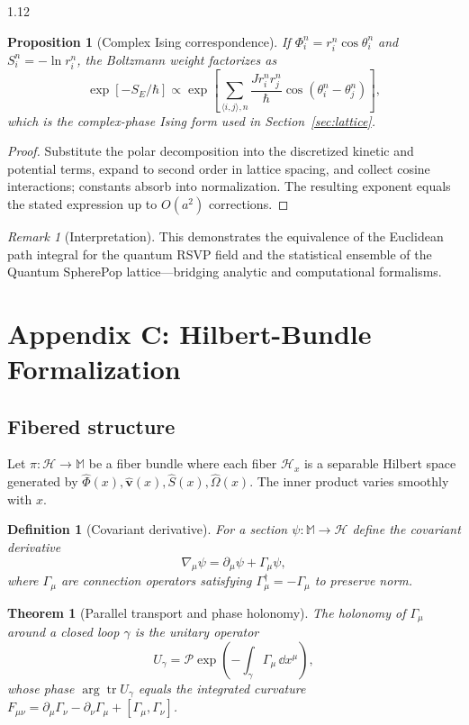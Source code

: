\documentclass[12pt,a4paper]{article}
\numberwithin{equation}{section}
\newtheorem{definition}{Definition}[section]
\newtheorem{proposition}{Proposition}[section]
\newtheorem{theorem}{Theorem}[section]
\theoremstyle{remark}
\newtheorem{remark}{Remark}[section]
\theoremstyle{definition}
\newcommand{\M}{\mathbb{M}}
\begin{document}
\begin{spacing}{1.12}
\begin{proposition}[Complex Ising correspondence]
\label{prop:complex-ising}
If $\Phi_i^n=r_i^n\cos\theta_i^n$ and $S_i^n=-\ln r_i^n$, the Boltzmann weight factorizes as
\[
\exp[-S_E/\hbar]
\propto
\exp\!\left[
\sum_{\langle i,j\rangle,n}
\frac{J r_i^n r_j^n}{\hbar}
\cos(\theta_i^n-\theta_j^n)
\right],
\]
which is the complex-phase Ising form used in Section~\ref{sec:lattice}.
\end{proposition}

\begin{proof}
Substitute the polar decomposition into the discretized kinetic and potential terms, expand to second order in lattice spacing, and collect cosine interactions; constants absorb into normalization.  
The resulting exponent equals the stated expression up to $O(a^2)$ corrections.
\end{proof}

\begin{remark}[Interpretation]
This demonstrates the equivalence of the Euclidean path integral for the quantum RSVP field and the statistical ensemble of the Quantum SpherePop lattice—bridging analytic and computational formalisms.
\end{remark}

\section*{Appendix C: Hilbert-Bundle Formalization}
\label{appendix:C}

\subsection*{Fibered structure}
Let $\pi:\mathscr{H}\!\to\!\M$ be a fiber bundle where each fiber
$\mathscr{H}_x$ is a separable Hilbert space generated by
$\hat{\Phi}(x),\hat{\mathbf{v}}(x),\hat{S}(x),\hat{\Omega}(x)$.
The inner product varies smoothly with $x$.

\begin{definition}[Covariant derivative]
For a section $\psi:\M\to\mathscr{H}$ define the covariant derivative
\[
\nabla_\mu\psi
=\partial_\mu\psi+\Gamma_\mu\psi,
\]
where $\Gamma_\mu$ are connection operators satisfying
$\Gamma_\mu^\dagger=-\Gamma_\mu$ to preserve norm.
\end{definition}

\begin{theorem}[Parallel transport and phase holonomy]
\label{thm:holonomy}
The holonomy of $\Gamma_\mu$ around a closed loop $\gamma$
is the unitary operator
\[
U_\gamma=\mathcal{P}\exp\!\left(-\!\int_\gamma\Gamma_\mu\,\dd x^\mu\right),
\]
whose phase $\arg\!\operatorname{tr}U_\gamma$
equals the integrated curvature
$F_{\mu\nu}=\partial_\mu\Gamma_\nu-\partial_\nu\Gamma_\mu+[\Gamma_\mu,\Gamma_\nu]$.
\end{theorem}


\end{spacing}
\end{document}
